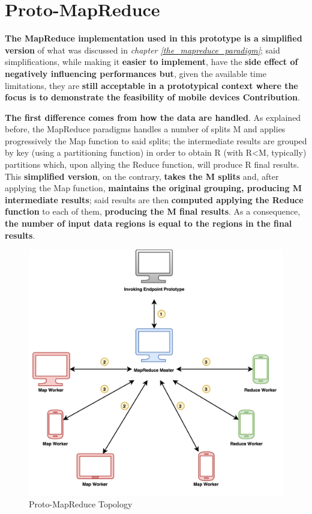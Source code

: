 \section{Proto-MapReduce}
\textbf{The MapReduce implementation used in this prototype is a simplified version} of what was discussed in \textit{chapter \ref{the_mapreduce_paradigm}}; said simplifications, while making it \textbf{easier to implement}, have the \textbf{side effect of negatively influencing performances but}, given the available time limitations, they are \textbf{still acceptable in a prototypical context where the focus is to demonstrate the feasibility of mobile devices Contribution}.

\textbf{The first difference comes from how the data are handled}. As explained before, the MapReduce paradigms handles a number of splits M and applies progressively the Map function to said splits; the intermediate results are grouped by key (using a partitioning function) in order to obtain R (with R<M, typically) partitions which, upon allying the Reduce function, will produce R final results. This \textbf{simplified version}, on the contrary, \textbf{takes the M splits} and, after applying the Map function, \textbf{maintains the original grouping, producing M intermediate results}; said results are then \textbf{computed applying the Reduce function} to each of them, \textbf{producing the M final results}. As a consequence, \textbf{the number of input data regions is equal to the regions in the final results}.

\vspace{10mm}

\begin{figure}[!ht]
    \centering
    \includegraphics[scale=1.18]{document/chapters/chapter_7/images/proto_mapreduce.png}
    \caption{Proto-MapReduce Topology}
    \label{fig:proto_mapreduce}
\end{figure}

